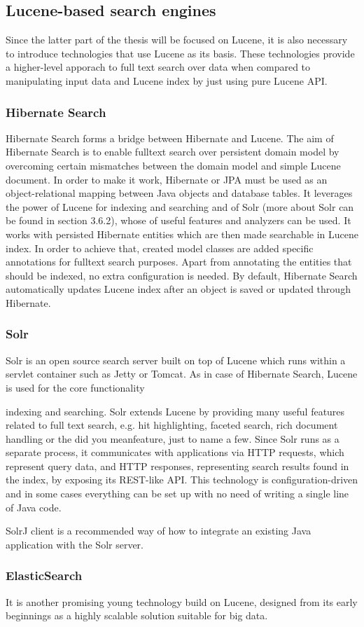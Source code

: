 \subsection{Lucene-based search engines}

Since the latter part of the thesis will be focused on Lucene, it
is also necessary to introduce technologies that use Lucene as its
basis. These technologies provide a higher-level apporach to full
text search over data when compared to manipulating input data and
Lucene index by just using pure Lucene API.


\subsubsection{Hibernate Search}

Hibernate Search \cite{HibernateSearchHome} forms a bridge between
Hibernate and Lucene. The aim of Hibernate Search is to enable fulltext
search over persistent domain model by overcoming certain mismatches
between the domain model and simple Lucene document. In order to make
it work, Hibernate or JPA must be used as an object-relational mapping
between Java objects and database tables. It leverages the power of
Lucene for indexing and searching and of Solr (more about Solr can
be found in section 3.6.2), whose of useful features and analyzers
can be used. It works with persisted Hibernate entities which are
then made searchable in Lucene index. In order to achieve that, created
model classes are added specific annotations for fulltext search purposes.
Apart from annotating the entities that should be indexed, no extra
configuration is needed. By default, Hibernate Search automatically
updates Lucene index after an object is saved or updated through Hibernate.


\subsubsection{Solr}

Solr \cite{SolrHome} is an open source search server built on top
of Lucene which runs within a servlet container such as Jetty or Tomcat.
As in case of Hibernate Search, Lucene is used for the core functionality

indexing and searching. Solr extends Lucene by providing
many useful features related to full text search, e.g. hit highlighting,
faceted search, rich document handling or the did you
meanfeature, just to name a few. Since Solr runs
as a separate process, it communicates with applications via HTTP
requests, which represent query data, and HTTP responses, representing
search results found in the index, by exposing its REST-like API.
This technology is configuration-driven and in some cases everything
can be set up with no need of writing a single line of Java code. 

SolrJ client is a recommended way of how to integrate an existing
Java application with the Solr server.


\subsubsection{ElasticSearch}

It is another promising young technology build on Lucene, designed from its early beginnings as a highly scalable solution suitable for big data.
